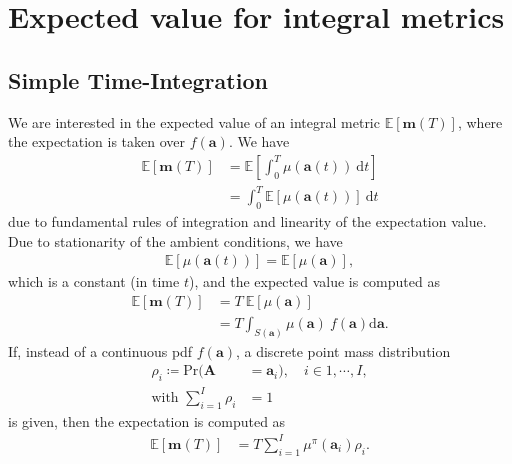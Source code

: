 \documentclass{article}
\begin{document}
    \section{Expected value for integral metrics}
    \subsection{Simple Time-Integration}
    We are interested in the expected value of an integral metric $\mathbb{E}\left[{\boldsymbol{m}}(T)\right]$, where the expectation is taken over $f(\boldsymbol{a})$. We have
    \begin{align}
        \mathbb{E}\left[{\boldsymbol{m}}(T)\right]&= \mathbb{E}\left[\int_0^T \mu(\boldsymbol{a}(t))\ \text{d}t\right]\\
        &= \int_0^T \mathbb{E}\left[\mu(\boldsymbol{a}(t))\right]\ \text{d}t\label{eq:expected_acc_metric}
    \end{align}
    due to fundamental rules of integration and linearity of the expectation value. Due to stationarity of the ambient conditions, we have
    \begin{align}
        \mathbb{E}\left[\mu(\boldsymbol{a}(t))\right] = \mathbb{E}\left[\mu(\boldsymbol{a})\right],
    \end{align}
    which is a constant (in time $t$), and the expected value is computed as
    \begin{align}
        \mathbb{E}\left[{\boldsymbol{m}}(T)\right] &= T\ \mathbb{E}\left[\mu(\boldsymbol{a})\right] \\
        &=T\int_{S(\boldsymbol{a})}\mu(\boldsymbol{a})\ f(\boldsymbol{a}) \text{d} \boldsymbol{a}.
    \end{align}
    If, instead of a continuous pdf $f(\boldsymbol{a})$, a discrete point mass distribution
    \begin{align}
        \rho_i \coloneqq \text{Pr}(\boldsymbol{A} &= \boldsymbol{a}_i), \quad i \in 1, \cdots, I,\\
        \text{with }\sum_{i = 1}^I \rho_i &= 1
    \end{align}
    is given, then the expectation is computed as   
    \begin{align}
        \mathbb{E}\left[{\boldsymbol{m}}(T)\right] &= T\sum_{i = 1}^I \mu^\pi(\boldsymbol{a}_i) \rho_i.
    \end{align}
\end{document}
